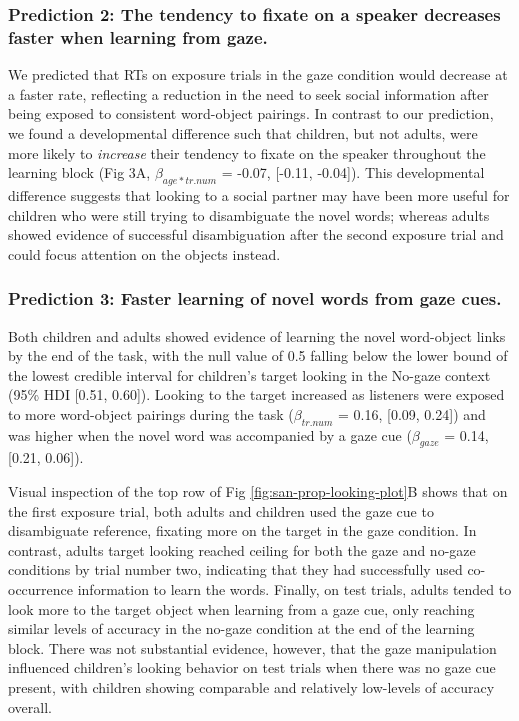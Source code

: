\documentclass[10pt, letterpaper]{article}
\begin{document}
\hypertarget{prediction-2-the-tendency-to-fixate-on-a-speaker-decreases-faster-when-learning-from-gaze.}{%
\subsubsection{Prediction 2: The tendency to fixate on a speaker
decreases faster when learning from
gaze.}\label{prediction-2-the-tendency-to-fixate-on-a-speaker-decreases-faster-when-learning-from-gaze.}}

We predicted that RTs on exposure trials in the gaze condition would
decrease at a faster rate, reflecting a reduction in the need to seek
social information after being exposed to consistent word-object
pairings. In contrast to our prediction, we found a developmental
difference such that children, but not adults, were more likely to
\emph{increase} their tendency to fixate on the speaker throughout the
learning block (Fig 3A, \(\beta_{age*tr.num}\) = -0.07, {[}-0.11,
-0.04{]}). This developmental difference suggests that looking to a
social partner may have been more useful for children who were still
trying to disambiguate the novel words; whereas adults showed evidence
of successful disambiguation after the second exposure trial and could
focus attention on the objects instead.

\hypertarget{prediction-3-faster-learning-of-novel-words-from-gaze-cues.}{%
\subsubsection{Prediction 3: Faster learning of novel words from gaze
cues.}\label{prediction-3-faster-learning-of-novel-words-from-gaze-cues.}}

Both children and adults showed evidence of learning the novel
word-object links by the end of the task, with the null value of 0.5
falling below the lower bound of the lowest credible interval for
children's target looking in the No-gaze context (95\% HDI {[}0.51,
0.60{]}). Looking to the target increased as listeners were exposed to
more word-object pairings during the task (\(\beta_{tr.num}\) = 0.16,
{[}0.09, 0.24{]}) and was higher when the novel word was accompanied by
a gaze cue (\(\beta_{gaze}\) = 0.14, {[}0.21, 0.06{]}).

Visual inspection of the top row of Fig \ref{fig:san-prop-looking-plot}B
shows that on the first exposure trial, both adults and children used
the gaze cue to disambiguate reference, fixating more on the target in
the gaze condition. In contrast, adults target looking reached ceiling
for both the gaze and no-gaze conditions by trial number two, indicating
that they had successfully used co-occurrence information to learn the
words. Finally, on test trials, adults tended to look more to the target
object when learning from a gaze cue, only reaching similar levels of
accuracy in the no-gaze condition at the end of the learning block.
There was not substantial evidence, however, that the gaze manipulation
influenced children's looking behavior on test trials when there was no
gaze cue present, with children showing comparable and relatively
low-levels of accuracy overall.
\end{document}
